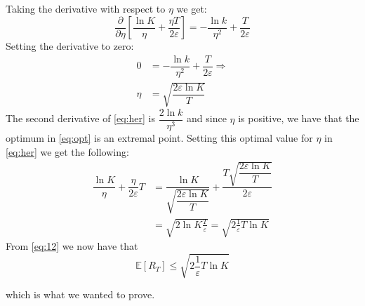 \documentclass{article}
\begin{document}
Taking the derivative with respect to $\eta$ we get:
\begin{equation}
\dfrac{\partial}{\partial \eta} \left[ \dfrac{\ln K}{\eta} + \dfrac{\eta T}{2 \varepsilon} \right] = - \dfrac{\ln k}{\eta^2} + \dfrac{T}{2 \varepsilon}
\end{equation}
Setting the derivative to zero:
\begin{align}
0 &= - \dfrac{\ln k}{\eta^2} + \dfrac{T}{2 \varepsilon} \Rightarrow \\
\eta &= \sqrt{\dfrac{2 \varepsilon \ln K}{T}}
\label{eq:opt}
\end{align}
The second derivative of \eqref{eq:her} is $\dfrac{2 \ln k}{\eta^3}$ and since $\eta$ is positive, we have that the optimum in \eqref{eq:opt} is an extremal point. Setting this optimal value for $\eta$ in \eqref{eq:her} we get the following:
\begin{align}
\dfrac{\ln K}{\eta} + \dfrac{\eta}{2 \varepsilon} T &=\dfrac{\ln K}{\sqrt{\dfrac{2 \varepsilon \ln K}{T}}} + \dfrac{T \sqrt{\dfrac{2 \varepsilon \ln K}{T}}}{2 \varepsilon} \\
&= \sqrt{2 \ln K \frac{T}{\varepsilon}}
= \sqrt{2 \frac{1}{\varepsilon} T  \ln K }
\end{align}
From \eqref{eq:12} we now have that 
\begin{equation}
\mathbb{E}[R_T] \leq \sqrt{2 \frac{1}{\varepsilon} T  \ln K }
\end{equation}

which is what we wanted to prove.
\end{document}
